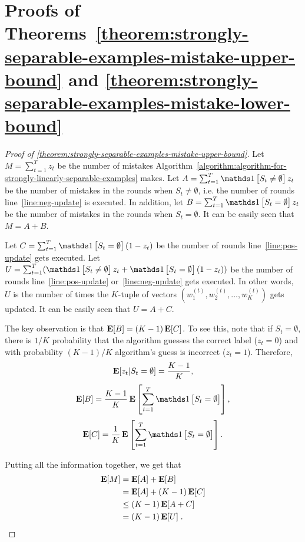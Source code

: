 \section{Proofs of Theorems~\ref{theorem:strongly-separable-examples-mistake-upper-bound} and \ref{theorem:strongly-separable-examples-mistake-lower-bound}}
\label{section:proofs-for-stringly-separable-examples}

\begin{proof}[Proof of \autoref{theorem:strongly-separable-examples-mistake-upper-bound}]
Let $M = \sum_{t=1}^T z_t$ be the number of mistakes
Algorithm~\ref{algorithm:algorithm-for-strongly-linearly-separable-examples}
makes. Let $A = \sum_{t=1}^T \indicator{S_t \neq \emptyset} z_t$ be the number of
mistakes in the rounds when $S_t \neq \emptyset$, i.e. the number of rounds
line~\ref{line:neg-update} is executed. In addition, let $B = \sum_{t=1}^T
\indicator{S_t = \emptyset} z_t$ be the number of mistakes in the rounds when $S_t =
\emptyset$. It can be easily seen that $M = A + B$.

Let $C = \sum_{t=1}^T \indicator{S_t = \emptyset}(1 - z_t)$ be the number of rounds
line~\ref{line:pos-update} gets executed. Let $U = \sum_{t=1}^T (\indicator{S_t \neq
\emptyset} z_t + \indicator{S_t = \emptyset}(1 - z_t))$ be the number of rounds
line~\ref{line:pos-update} or~\ref{line:neg-update} gets executed. In other
words, $U$ is the number of times the $K$-tuple of vectors $(w_1^{(t)},
w_2^{(t)}, \dots, w_K^{(t)})$ gets updated. It can be easily seen that $U = A +
C$.

The key observation is that $\operatorname*{\mathbf{E}}[B] = (K-1) \operatorname*{\mathbf{E}}[C]$.
To see this, note that if $S_t = \emptyset$, there is $1/K$ probability that the algorithm
guesses the correct label ($z_t = 0$) and with probability $(K-1)/K$ algorithm's guess is
incorrect ($z_t = 1$). Therefore,
\[ \operatorname*{\mathbf{E}}[ z_t |S_t = \emptyset] = \frac{K-1}{K}, \]
\[ \Exp[B] = \frac{K-1}{K} \Exp \sbr{ \sum_{t=1}^T \indicator{S_t = \emptyset} }, \]
\[ \Exp[C] = \frac{1}{K} \Exp \sbr{ \sum_{t=1}^T \indicator{S_t = \emptyset} }. \]

Putting all the information together, we get that
\begin{align}
\operatorname*{\mathbf{E}}[M]
& = \operatorname*{\mathbf{E}}[A] + \operatorname*{\mathbf{E}}[B] \nonumber \\
& = \operatorname*{\mathbf{E}}[A] + (K-1) \operatorname*{\mathbf{E}}[C] \nonumber \\
& \le (K-1) \operatorname*{\mathbf{E}}[A + C] \nonumber\\
& = (K-1) \operatorname*{\mathbf{E}}[U]  \; .
\label{eqn:mistake-update}
\end{align}


\end{proof}
